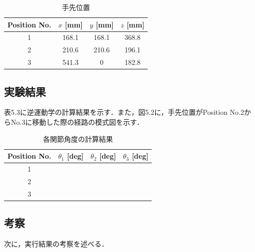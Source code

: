 \begin{table}[h]
  \centering
  \caption{手先位置}
  \begin{tabular}{|c|c|c|c|}
    \hline
    Position No. & $x$ [mm] & $y$ [mm] & $z$ [mm] \\ \hline
    \hline
    1            & 168.1    & 168.1    & 368.8    \\ \hline
    2            & 210.6    & 210.6    & 196.1    \\ \hline
    3            & 541.3    & 0        & 182.8    \\ \hline
  \end{tabular}
\end{table}


\subsection{実験結果}
表5.3に逆運動学の計算結果を示す．また，図5.2に，手先位置がPosition No.2からNo.3に移動した際の経路の模式図を示す．

\begin{table}[h]
  \centering
  \caption{各関節角度の計算結果}
  \begin{tabular}{|c|c|c|c|}
    \hline
    Position No. & $\theta_1$ [deg] & $\theta_2$ [deg] & $\theta_3$ [deg] \\ \hline
    \hline
    1            &                  &                  &                  \\ \hline
    2            &                  &                  &                  \\ \hline
    3            &                  &                  &                  \\ \hline
  \end{tabular}
\end{table}

\subsection{考察}
次に，実行結果の考察を述べる．
